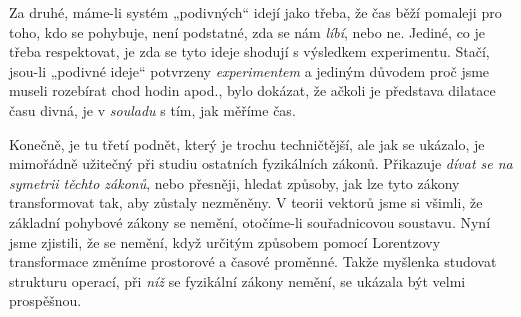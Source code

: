     Za druhé, máme-li systém „podivných“ idejí jako třeba, že čas běží pomaleji pro toho, kdo se 
    pohybuje, není podstatné, zda se nám \emph{líbí}, nebo ne. Jediné, co je třeba respektovat, je 
    zda se tyto ideje shodují s výsledkem experimentu. Stačí, jsou-li „podivné ideje“ potvrzeny 
    \emph{experimentem} a jediným důvodem proč jsme museli rozebírat chod hodin apod., bylo 
    dokázat, že ačkoli je představa dilatace času divná, je v \emph{souladu} s tím, jak měříme čas.
    
    Konečně, je tu třetí podnět, který je trochu techničtější, ale jak se ukázalo, je mimořádně 
    užitečný při studiu ostatních fyzikálních zákonů. Přikazuje \emph{dívat se na symetrii těchto 
    zákonů}, nebo přesněji, hledat způsoby, jak lze tyto zákony transformovat tak, aby zůstaly 
    nezměněny. V teorii vektorů jsme si všimli, že základní pohybové zákony se nemění, otočíme-li 
    souřadnicovou soustavu. Nyní jsme zjistili, že se nemění, když určitým způsobem pomocí 
    Lorentzovy transformace změníme prostorové a časové proměnné. Takže myšlenka studovat strukturu 
    operací, při \emph{níž} se fyzikální zákony nemění, se ukázala být velmi prospěšnou.
    
